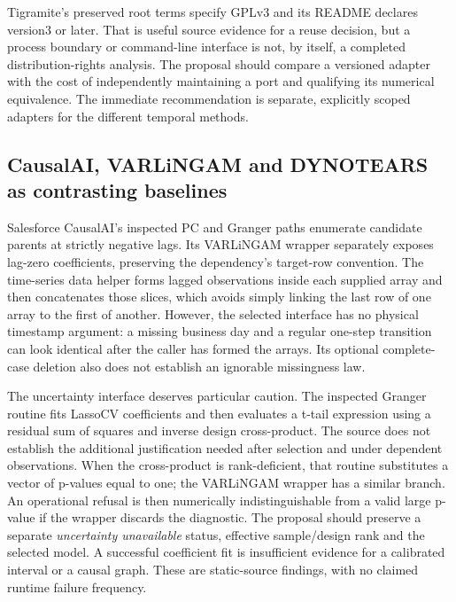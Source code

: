 Tigramite's preserved root terms specify GPLv3 and its README declares
version3 or later. That is useful source evidence for a reuse decision,
but a process boundary or command-line interface is not, by itself, a
completed distribution-rights analysis. The proposal should compare a
versioned adapter with the cost of independently maintaining a port and
qualifying its numerical equivalence. The immediate recommendation is
separate, explicitly scoped adapters for the different temporal methods.
\citep{exec14_pt_tigramite,exec14_pt_contract}

\subsection{CausalAI, VARLiNGAM and DYNOTEARS as contrasting baselines}

Salesforce CausalAI's inspected PC and Granger paths enumerate candidate
parents at strictly negative lags. Its VARLiNGAM wrapper separately exposes
lag-zero coefficients, preserving the dependency's target-row convention.
The time-series data helper forms lagged observations inside each supplied
array and then concatenates those slices, which avoids simply linking the
last row of one array to the first of another. However, the selected
interface has no physical timestamp argument: a missing business day and
a regular one-step transition can look identical after the caller has
formed the arrays. Its optional complete-case deletion also does not
establish an ignorable missingness law.\citep{exec14_pt_causalai}

The uncertainty interface deserves particular caution. The inspected
Granger routine fits LassoCV coefficients and then evaluates a t-tail
expression using a residual sum of squares and inverse design cross-product.
The source does not establish the additional justification needed after
selection and under dependent observations. When the cross-product is
rank-deficient, that routine substitutes a vector of p-values equal to one;
the VARLiNGAM wrapper has a similar branch. An operational refusal is then
numerically indistinguishable from a valid large p-value if the wrapper
discards the diagnostic. The proposal should preserve a separate
\emph{uncertainty unavailable} status, effective sample/design rank and
the selected model. A successful coefficient fit is insufficient evidence
for a calibrated interval or a causal graph. These are static-source
findings, with no claimed runtime failure frequency.
\citep{exec14_pt_causalai}

